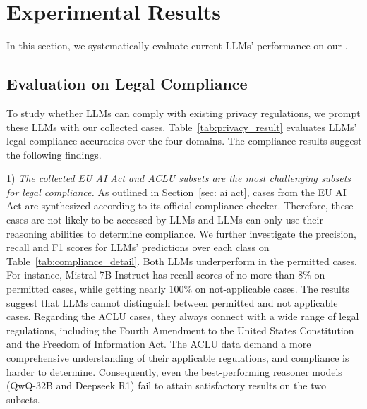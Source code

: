 \section{Experimental Results}


In this section, we systematically evaluate current LLMs' performance on our \name.






\subsection{Evaluation on Legal Compliance}
To study whether LLMs can comply with existing privacy regulations, we prompt these LLMs with our collected cases.
Table~\ref{tab:privacy_result} evaluates LLMs' legal compliance accuracies over the four domains.
The compliance results suggest the following findings.

1) \textit{The collected EU AI Act and ACLU subsets are the most challenging subsets for legal compliance. }
As outlined in Section~\ref{sec: ai act}, cases from the EU AI Act are synthesized according to its official compliance checker.
Therefore, these cases are not likely to be accessed by LLMs and LLMs can only use their reasoning abilities to determine compliance.
We further investigate the precision, recall and F1 scores for LLMs' predictions over each class on Table~\ref{tab:compliance_detail}.
Both LLMs underperform in the permitted cases.
For instance, Mistral-7B-Instruct has recall scores of no more than 8\% on permitted cases, while getting nearly 100\% on not-applicable cases.
The results suggest that LLMs cannot distinguish between permitted and not applicable cases.
Regarding the ACLU cases, they always connect with a wide range of legal regulations, including the Fourth Amendment to the United States Constitution and the Freedom of Information Act.
The ACLU data demand a more comprehensive understanding of their applicable regulations, and compliance is harder to determine.
Consequently, even the best-performing reasoner models (QwQ-32B and Deepseek R1) fail to attain satisfactory results on the two subsets.


